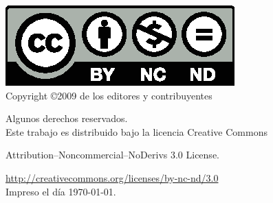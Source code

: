 
\begin{titlepage}

\vspace*{5in}

\begin{figure}[b]
\includegraphics[clip, scale=1]{image/by-nc-nd.eps}
\\

Copyright \copyright  2009 de los editores y contribuyentes

Algunos derechos reservados.
\\

Este trabajo es distribuido bajo la licencia Creative Commons

Attribution–Noncommercial–NoDerivs 3.0 License.

\url{http://creativecommons.org/licenses/by-nc-nd/3.0}
\\

Impreso el día {\today}.
\end{figure}

\end{titlepage}

